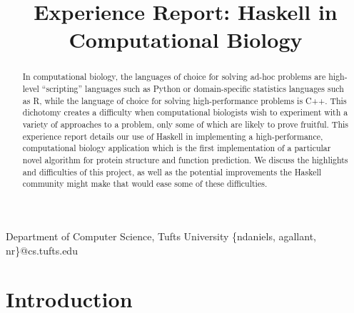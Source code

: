 \documentclass[preprint,nonatbib,blockstyle,nocopyrightspace,times]{sigplanconf}
\begin{document}
\copyrightdata{[to be supplied]} 


\title{Experience Report: Haskell in Computational Biology}

           {Department of Computer Science, Tufts University}
           {\{ndaniels, agallant, nr\}@cs.tufts.edu}


\maketitle

\begin{abstract}
In computational biology, the languages of choice for solving ad-hoc problems are high-level
``scripting'' languages such as Python or domain-specific statistics languages such as R,
while the language of choice for solving high-performance problems is C++.
This dichotomy creates a difficulty when computational biologists wish to experiment with a
variety of approaches to a problem, only some of which are likely to prove fruitful.
This experience report details our use of Haskell in implementing a high-performance,
computational biology application which is the first implementation of a particular
novel algorithm for protein structure and function prediction. We discuss the highlights
and difficulties of this project, as well as the potential improvements the Haskell
community might make that would ease some of these difficulties.
\end{abstract}

% 
% 

\section{Introduction}
\end{document}
